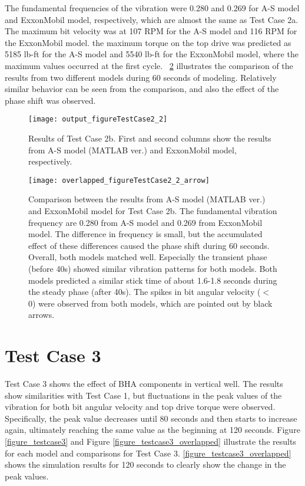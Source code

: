 The fundamental frequencies of the vibration were 0.280 and 0.269 for A-S model and ExxonMobil model, respectively, which are almost the same as Test Case 2a. The maximum bit velocity was at 107 RPM for the A-S model and 116 RPM for the ExxonMobil model. the maximum torque on the top drive was predicted as 5185 lb-ft for the A-S model and 5540 lb-ft for the ExxonMobil model, where the maximum values occurred at the first cycle. \figurename~\ref{figure_testcase2_2_overlapped} illustrates the comparison of the results from two different models during 60 seconds of modeling. Relatively similar behavior can be seen from the comparison, and also the effect of the phase shift was observed.

\begin{figure}
  \centering
  \texttt{[image: output\_figureTestCase2\_2]}
  \caption[Results of Test Case 2b]{Results of Test Case 2b. First and second columns show the results from A-S model (MATLAB ver.) and ExxonMobil model, respectively.}\label{figure_testcase2_2}
\end{figure}

\begin{figure}
  \centering
  \texttt{[image: overlapped\_figureTestCase2\_2\_arrow]}
  \caption[Comparison of the results for Test Case 2b]{Comparison between the results from A-S model (MATLAB ver.) and ExxonMobil model for Test Case 2b. The fundamental vibration frequency are 0.280 from A-S model and 0.269 from ExxonMobil model. The difference in frequency is small, but the accumulated effect of these differences caused the phase shift during 60 seconds. Overall, both models matched well. Especially the transient phase (before 40s) showed similar vibration patterns for both models. Both models predicted a similar stick time of about 1.6-1.8 seconds during the steady phase (after 40s). The spikes in bit angular velocity ($<$ 0) were observed from both models, which are pointed out by black arrows.}\label{figure_testcase2_2_overlapped}
\end{figure}

\section{Test Case 3}
Test Case 3 shows the effect of BHA components in vertical well. The results show similarities with Test Case 1, but fluctuations in the peak values of the vibration for both bit angular velocity and top drive torque were observed. Specifically, the peak value decreases until 80 seconds and then starts to increase again, ultimately reaching the same value as the beginning at 120 seconds. Figure \ref{figure_testcase3} and Figure \ref{figure_testcase3_overlapped} illustrate the results for each model and comparisons for Test Case 3. \ref{figure_testcase3_overlapped} shows the simulation results for 120 seconds to clearly show the change in the peak values.

